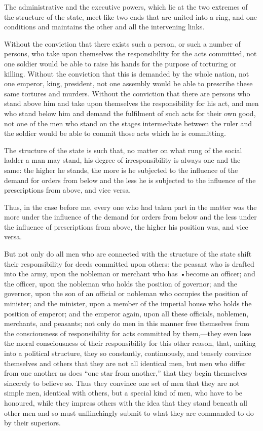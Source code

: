 \documentclass{book}
\begin{document}
The administrative and the executive powers, which lie at the two extremes of the structure of the state, meet like two ends that are united into a ring, and one conditions and maintains the other and all the intervening links.

Without the conviction that there exists such a person, or such a number of persons, who take upon themselves the responsibility for the acts committed, not one soldier would be able to raise his hands for the purpose of torturing or killing. Without the conviction that this is demanded by the whole nation, not one emperor, king, president, not one assembly would be able to prescribe these same tortures and murders. Without the conviction that there are persons who stand above him and take upon themselves the responsibility for his act, and men who stand below him and demand the fulfilment of such acts for their own good, not one of the men who stand on the stages intermediate between the ruler and the soldier would be able to commit those acts which he is committing.

The structure of the state is such that, no matter on what rung of the social ladder a man may stand, his degree of irresponsibility is always one and the same: the higher he stands, the more is he subjected to the influence of the demand for orders from below and the less he is subjected to the influence of the prescriptions from above, and vice versa.

Thus, in the case before me, every one who had taken part in the matter was the more under the influence of the demand for orders from below and the less under the influence of prescriptions from above, the higher his position was, and vice versa.

But not only do all men who are connected with the structure of the state shift their responsibility for deeds committed upon others: the peasant who is drafted into the army, upon the nobleman or merchant who has •become an officer; and the officer, upon the nobleman who holds the position of governor; and the governor, upon the son of an official or nobleman who occupies the position of minister; and the minister, upon a member of the imperial house who holds the position of emperor; and the emperor again, upon all these officials, noblemen, merchants, and peasants; not only do men in this manner free themselves from the consciousness of responsibility for acts committed by them,—they even lose the moral consciousness of their responsibility for this other reason, that, uniting into a political structure, they so constantly, continuously, and tensely convince themselves and others that they are not all identical men, but men who differ from one another as does “one star from another,” that they begin themselves sincerely to believe so. Thus they convince one set of men that they are not simple men, identical with others, but a special kind of men, who have to be honoured, while they impress others with the idea that they stand beneath all other men and so must unflinchingly submit to what they are commanded to do by their superiors.
\end{document}
